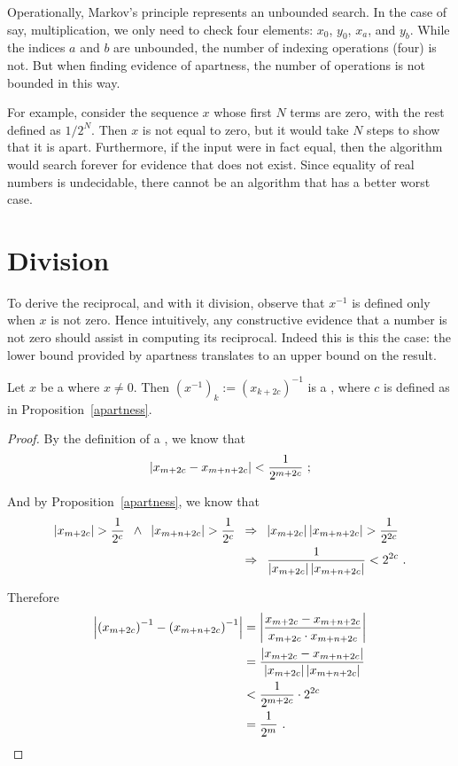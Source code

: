 \documentclass[leqno]{report}
\begin{document}
Operationally, Markov's principle represents an unbounded search. In the case of say, multiplication, we only need to check four elements: $x_0$, $y_0$, $x_a$, and $y_b$. While the indices $a$ and $b$ are unbounded, the number of indexing operations (four) is not. But when finding evidence of apartness, the number of operations is not bounded in this way.

For example, consider the sequence $x$ whose first $N$ terms are zero, with the rest defined as $1/2^N$. Then $x$ is not equal to zero, but it would take $N$ steps to show that it is apart. Furthermore, if the input were in fact equal, then the algorithm would search forever for evidence that does not exist. Since equality of real numbers is undecidable, there cannot be an algorithm that has a better worst case.

\section{Division}

To derive the reciprocal, and with it division, observe that $x^{-1}$ is defined only when $x$ is not zero. Hence intuitively, any constructive evidence that a number is not zero should assist in computing its reciprocal. Indeed this is this the case: the lower bound provided by apartness translates to an upper bound on the result.

\begin{Proposition}[Reciprocal]
    Let $x$ be a \FCCS{} where $x \neq 0$. Then $\left(x^{-1}\right)_k := \left(x_{k+2c}\right)^{-1}$ is a \FCCS, where $c$ is defined as in Proposition~\ref{apartness}.
\end{Proposition}

\begin{proof}
    By the definition of a \FCCS, we know that
    \[
        \left| x_{m+2c} - x_{m+n+2c} \right| < \frac{1}{2^{m+2c}} \ ;
    \]

    And by Proposition~\ref{apartness}, we know that
    \begin{align*}
        \left| x_{m+2c} \right| > \frac{1}{2^c} \enspace\wedge\enspace
        \left| x_{m+n+2c} \right| > \frac{1}{2^c}
        \enspace&\Rightarrow\enspace
        \left| x_{m+2c} \right| \left| x_{m+n+2c} \right| > \frac{1}{2^{2c}} \\
        &\Rightarrow\enspace
        \frac{1}{\left| x_{m+2c} \right| \left| x_{m+n+2c} \right|} < 2^{2c} \ .
    \end{align*}

    Therefore
    \begin{align*}
        \left| \left(x_{m+2c}\right)^{-1} - \left(x_{m+n+2c}\right)^{-1} \right|
        &= \left| \frac{x_{m+2c} - x_{m+n+2c}}{x_{m+2c} \cdot x_{m+n+2c}} \right| \\
        &= \frac{\left| x_{m+2c} - x_{m+n+2c} \right|}{\left| x_{m+2c} \right| \left| x_{m+n+2c} \right|} \\
        &< \frac{1}{2^{m+2c}} \cdot 2^{2c} \\
        &= \frac{1}{2^m} \ . \qedhere
    \end{align*}
\end{proof}
\end{document}
